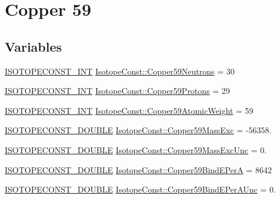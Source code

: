 \hypertarget{group___isotope_const-_copper-_cu59}{}\section{Copper 59}
\label{group___isotope_const-_copper-_cu59}
\subsection*{Variables}
\begin{DoxyCompactItemize}
\item 
\mbox{\hyperlink{group___isotope_const-_macros_ga5f18360b3e99483a35c32d789e62621c}{I\+S\+O\+T\+O\+P\+E\+C\+O\+N\+S\+T\+\_\+\+I\+NT}} \mbox{\hyperlink{group___isotope_const-_copper-_cu59_ga8003aaa5b957bdaa602af583e5bec245}{Isotope\+Const\+::\+Copper59\+Neutrons}} = 30
\item 
\mbox{\hyperlink{group___isotope_const-_macros_ga5f18360b3e99483a35c32d789e62621c}{I\+S\+O\+T\+O\+P\+E\+C\+O\+N\+S\+T\+\_\+\+I\+NT}} \mbox{\hyperlink{group___isotope_const-_copper-_cu59_ga25d7c4965ace68ada08dd6e426f8eb51}{Isotope\+Const\+::\+Copper59\+Protons}} = 29
\item 
\mbox{\hyperlink{group___isotope_const-_macros_ga5f18360b3e99483a35c32d789e62621c}{I\+S\+O\+T\+O\+P\+E\+C\+O\+N\+S\+T\+\_\+\+I\+NT}} \mbox{\hyperlink{group___isotope_const-_copper-_cu59_gaf450d48f28092338982008b53a42fd44}{Isotope\+Const\+::\+Copper59\+Atomic\+Weight}} = 59
\item 
\mbox{\hyperlink{group___isotope_const-_macros_ga8f45a7272ce02c0b4c65c44636ed719a}{I\+S\+O\+T\+O\+P\+E\+C\+O\+N\+S\+T\+\_\+\+D\+O\+U\+B\+LE}} \mbox{\hyperlink{group___isotope_const-_copper-_cu59_ga03f835156ff672ceed0d3bc6c8b4a1ff}{Isotope\+Const\+::\+Copper59\+Mass\+Exc}} = -\/56358.
\item 
\mbox{\hyperlink{group___isotope_const-_macros_ga8f45a7272ce02c0b4c65c44636ed719a}{I\+S\+O\+T\+O\+P\+E\+C\+O\+N\+S\+T\+\_\+\+D\+O\+U\+B\+LE}} \mbox{\hyperlink{group___isotope_const-_copper-_cu59_ga0911409280caa6538af05b55449e8a83}{Isotope\+Const\+::\+Copper59\+Mass\+Exc\+Unc}} = 0.
\item 
\mbox{\hyperlink{group___isotope_const-_macros_ga8f45a7272ce02c0b4c65c44636ed719a}{I\+S\+O\+T\+O\+P\+E\+C\+O\+N\+S\+T\+\_\+\+D\+O\+U\+B\+LE}} \mbox{\hyperlink{group___isotope_const-_copper-_cu59_ga22a7085d23cf2daf5d10f48e28c93cb4}{Isotope\+Const\+::\+Copper59\+Bind\+E\+PerA}} = 8642
\item 
\mbox{\hyperlink{group___isotope_const-_macros_ga8f45a7272ce02c0b4c65c44636ed719a}{I\+S\+O\+T\+O\+P\+E\+C\+O\+N\+S\+T\+\_\+\+D\+O\+U\+B\+LE}} \mbox{\hyperlink{group___isotope_const-_copper-_cu59_gab8ed529d68d98611337b30db2deb0bfe}{Isotope\+Const\+::\+Copper59\+Bind\+E\+Per\+A\+Unc}} = 0.

\end{DoxyCompactItemize}
